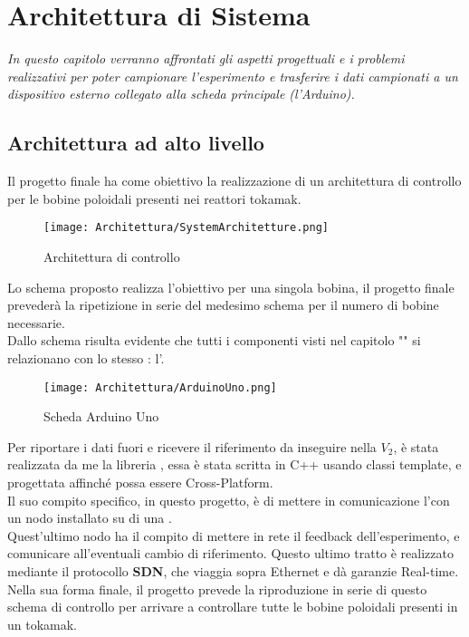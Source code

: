 \chapter{Architettura di Sistema}\label{cap:Architettura}

\begin{minipage}{12cm}\textit{
		In questo capitolo verranno affrontati gli aspetti progettuali e i problemi realizzativi per poter campionare l'esperimento e trasferire i dati campionati a un dispositivo esterno collegato alla scheda principale (l'Arduino).
	}
\end{minipage}

\vspace*{1cm}

\section{Architettura ad alto livello}\label{sec:architettura}
Il progetto finale ha come obiettivo la realizzazione di un architettura di controllo per le bobine poloidali presenti nei reattori tokamak.

\begin{figure}[h] \label{fig:archietturaControllo}
	\centering
	\texttt{[image: Architettura/SystemArchitetture.png]}
	\caption[Schema finale dell'archiettettura di controllo]{Architettura di controllo}
\end{figure}

\noindent
Lo schema proposto realizza l'obiettivo per una singola bobina, il progetto finale prevederà la ripetizione in serie del medesimo schema per il numero di bobine necessarie.\\
Dallo schema risulta evidente che tutti i componenti visti nel capitolo "" si relazionano con lo stesso \microControllore: l'\ArduinoUno.
\begin{figure}[h]
	\centering
	\texttt{[image: Architettura/ArduinoUno.png]}
	\caption[Scheda Arduino Uno]{Scheda Arduino Uno}
\end{figure}

\noindent
Per riportare i dati fuori e ricevere il riferimento da inseguire nella $V_2$, è stata realizzata da me la libreria \cite*{EMP}, essa è stata scritta in C++ usando classi template, e progettata affinché possa essere Cross-Platform.\\
Il suo compito specifico, in questo progetto, è di mettere in comunicazione l'\ArduinoUno con un nodo \MARTe installato su di una \Rasp.\\
Quest'ultimo nodo ha il compito di mettere in rete il feedback dell'esperimento, e comunicare all'\ArduinoUno eventuali cambio di riferimento. Questo ultimo tratto è realizzato mediante il protocollo \textbf{SDN}, che viaggia sopra Ethernet e dà garanzie Real-time.\\
Nella sua forma finale, il progetto prevede la riproduzione in serie di questo schema di controllo per arrivare a controllare tutte le bobine poloidali presenti in un tokamak.

